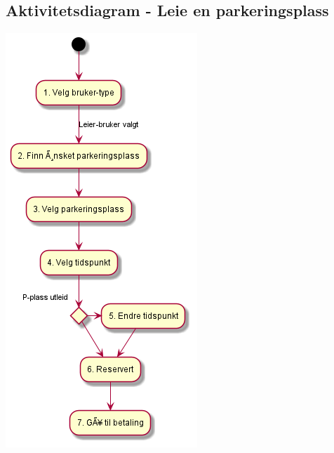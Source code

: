 \documentclass[12pt]{article}
\begin{document}
    \subsection{Aktivitetsdiagram - Leie en parkeringsplass}
    \includegraphics[max width=\textwidth]{bilder/diagrammer/aktivitet_leier_bestilling.png}
\end{document}
